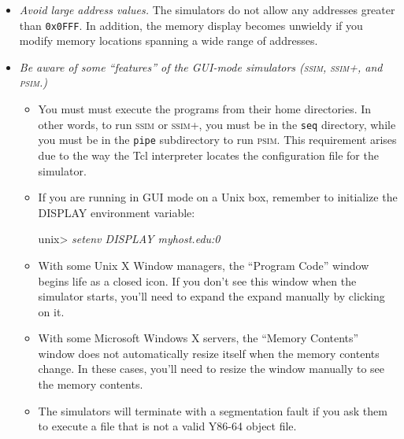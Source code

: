 \documentclass[11pt]{article}
\begin{document}
\begin{itemize}
\item {\em Avoid large address values.}  The simulators do not allow
any addresses greater than \texttt{0x0FFF}.  In addition, the memory
display becomes unwieldy if you modify memory locations spanning a
wide range of addresses.

\item {\em Be aware of some ``features'' of the GUI-mode simulators
(\textsc{ssim}, \textsc{ssim+}, and \textsc{psim}.)}
\begin{itemize}
\item
You must must execute the programs from their home directories.  In
other words, to run \textsc{ssim} or \textsc{ssim+}, you must be in
the \texttt{seq} directory, while you must be in the \texttt{pipe}
subdirectory to run \textsc{psim}.  This requirement arises due to the
way the Tcl interpreter locates the configuration file for
the simulator.

\item If you are running in GUI mode on a Unix box, remember to
initialize the DISPLAY environment variable:
\begin{tty}
unix> {\em setenv DISPLAY myhost.edu:0}
\end{tty}

\item With some Unix X Window managers, the ``Program Code'' window 
begins life as a closed icon. If you don't see this window when the
simulator starts, you'll need to expand the expand manually by
clicking on it.

\item With some Microsoft Windows X servers, the ``Memory Contents'' window
does not automatically resize itself when the memory contents change.
In these cases, you'll need to resize the window manually to see the
memory contents.

\item The simulators 
will terminate with a segmentation fault if you ask them to execute a file
that is not a valid Y86-64 object file.
\end{itemize}

\end{itemize}
\end{document}
